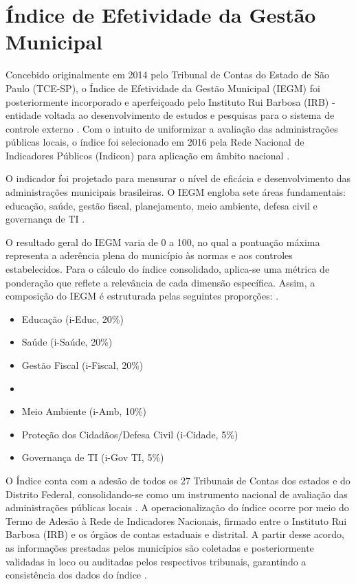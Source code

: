 \section{Índice de Efetividade da Gestão Municipal}
Concebido originalmente em 2014 pelo Tribunal de Contas do Estado de São Paulo (TCE-SP), o Índice de 
Efetividade da Gestão Municipal (IEGM) foi posteriormente incorporado e aperfeiçoado pelo Instituto 
Rui Barbosa (IRB) - entidade voltada ao desenvolvimento de estudos e pesquisas para o sistema de 
controle externo \cite{iegm_ceara_2022}. Com o intuito de uniformizar a avaliação das administrações 
públicas locais, o índice foi selecionado em 2016 pela Rede Nacional de Indicadores Públicos 
(Indicon) para aplicação em âmbito nacional \cite{iegm_ceara_2022}.

O indicador foi projetado para mensurar o nível de eficácia e desenvolvimento das 
administrações municipais brasileiras. O IEGM engloba sete áreas fundamentais: educação, saúde, 
gestão fiscal, planejamento, meio ambiente, defesa civil e governança de TI \cite{lima_influencia_2023}.

O resultado geral do IEGM varia de 0 a 100, no qual a pontuação máxima representa a aderência 
plena do município às normas e aos controles estabelecidos. Para o cálculo do índice consolidado, 
aplica-se uma métrica de ponderação que reflete a relevância de cada dimensão específica. Assim, a 
composição do IEGM é estruturada pelas seguintes proporções:
\cite{lima_influencia_2023}.


\begin{itemize}
  \item Educação (i-Educ, 20\%)
  \item Saúde (i-Saúde, 20\%)
  \item Gestão Fiscal (i-Fiscal, 20\%)
  \item {}
  \item Meio Ambiente (i-Amb, 10\%)
  \item Proteção dos Cidadãos/Defesa Civil (i-Cidade, 5\%)
  \item Governança de TI (i-Gov TI, 5\%)
\end{itemize}

O Índice conta com a adesão de todos os 27 Tribunais de Contas dos estados e do Distrito Federal, 
consolidando-se como um instrumento nacional de avaliação das administrações públicas locais \cite{araujo_gestoes_municipais_2021}. 
A operacionalização do índice ocorre por meio do Termo de Adesão à Rede de Indicadores Nacionais, 
firmado entre o Instituto Rui Barbosa (IRB) e os órgãos de contas estaduais e distrital. A partir 
desse acordo, as informações prestadas pelos municípios são coletadas e posteriormente validadas 
in loco ou auditadas pelos respectivos tribunais, garantindo a consistência dos dados do índice \cite{araujo_gestoes_municipais_2021}.

